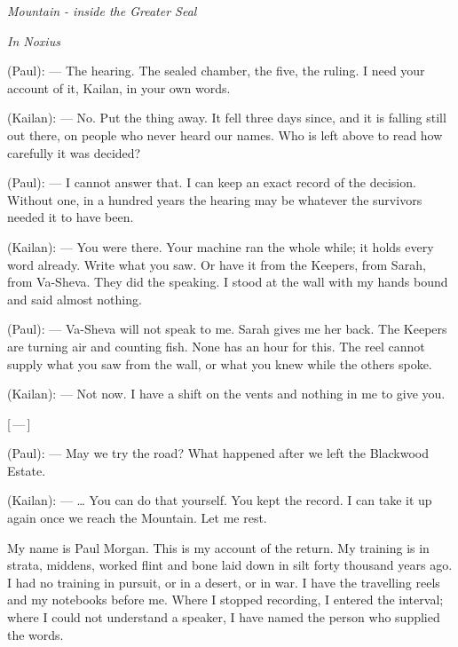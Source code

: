 
\begin{center}\small\itshape Mountain - inside the Greater Seal\end{center}

\begin{room}

\textit{In Noxius}

(Paul): --- The hearing. The sealed chamber, the five, the ruling. I need your account of it, Kailan, in your own words.

(Kailan): --- No. Put the thing away. It fell three days since, and it is falling still out there, on people who never heard our names. Who is left above to read how carefully it was decided?

(Paul): --- I cannot answer that. I can keep an exact record of the decision. Without one, in a hundred years the hearing may be whatever the survivors needed it to have been.

(Kailan): --- You were there. Your machine ran the whole while; it holds every word already. Write what you saw. Or have it from the Keepers, from Sarah, from Va-Sheva. They did the speaking. I stood at the wall with my hands bound and said almost nothing.

(Paul): --- Va-Sheva will not speak to me. Sarah gives me her back. The Keepers are turning air and counting fish. None has an hour for this. The reel cannot supply what you saw from the wall, or what you knew while the others spoke.

(Kailan): --- Not now. I have a shift on the vents and nothing in me to give you.

\centerline{[\,---\,]}

(Paul): --- May we try the road? What happened after we left the Blackwood Estate.

(Kailan): --- \ldots{} You can do that yourself. You kept the record. I can take it up again once we reach the Mountain. Let me rest.

\end{room}

My name is Paul Morgan. This is my account of the return. My training is in strata, middens, worked flint and bone laid down in silt forty thousand years ago. I had no training in pursuit, or in a desert, or in war. I have the travelling reels and my notebooks before me. Where I stopped recording, I entered the interval; where I could not understand a speaker, I have named the person who supplied the words.\par

